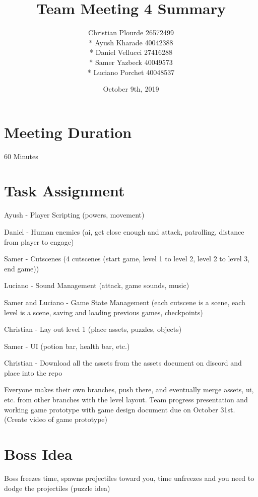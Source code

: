 \documentclass{article}
\begin{document}
\title{Team Meeting 4 Summary}
\author{Christian Plourde 26572499\\*
		Ayush Kharade 40042388\\*
		Daniel Vellucci 27416288\\*
		Samer Yazbeck 40049573\\*
		Luciano Porchet 40048537
		}
\date{October 9th, 2019}

\maketitle

\newpage

\section{Meeting Duration}
60 Minutes

\section{Task Assignment}
\begin{description}
\item Ayush - Player Scripting (powers, movement)
\item Daniel - Human enemies (ai, get close enough and attack, patrolling, distance from player to engage)
\item Samer - Cutscenes (4 cutscenes (start game, level 1 to level 2, level 2 to level 3, end game))
\item Luciano - Sound Management (attack, game sounds, music)
\item Samer and Luciano - Game State Management (each cutscene is a scene, each level is a scene, saving and loading previous games, checkpoints)
\item Christian - Lay out level 1 (place assets, puzzles, objects)
\item Samer - UI (potion bar, health bar, etc.)
\item Christian - Download all the assets from the assets document on discord and place into the repo
\end{description}

Everyone makes their own branches, push there, and eventually merge assets, ui, etc. from other branches with the level layout. Team progress presentation and working game prototype with game design document due on October 31st. (Create video of game prototype)

\section{Boss Idea}
Boss freezes time, spawns projectiles toward you, time unfreezes and you need to dodge the projectiles (puzzle idea)
\end{document}
